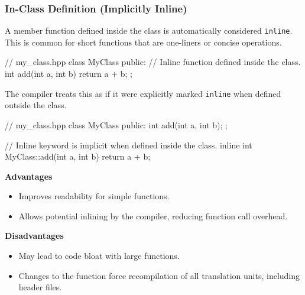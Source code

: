 \vspace{-0.5em}

\subsubsection{In-Class Definition (Implicitly Inline)}

\vspace{-0.5em}

A member function defined inside the class is automatically considered \texttt{inline}. This is common for short functions that are one-liners or concise operations.

\begin{codeblock}[language=C++, numbers=none]
// my_class.hpp
class MyClass {
public:
    // Inline function defined inside the class.
    int add(int a, int b) {
        return a + b;
    }
};
\end{codeblock}

The compiler treats this as if it were explicitly marked \texttt{inline} when defined outside the class.

\begin{codeblock}[language=C++, numbers=none]
// my_class.hpp
class MyClass {
public:
    int add(int a, int b);
};

// Inline keyword is implicit when defined inside the class.
inline int MyClass::add(int a, int b) {
    return a + b;
}
\end{codeblock}

\begin{minipage}[H]{0.48\textwidth}
    \textbf{Advantages}
    \begin{itemize}
        \item Improves readability for simple functions.
        \item Allows potential inlining by the compiler, reducing function call overhead.
    \end{itemize}
\end{minipage}%
\hfill
\begin{minipage}[H]{0.49\textwidth}
    \textbf{Disadvantages}
    \begin{itemize}
        \item May lead to code bloat with large functions.
        \item Changes to the function force recompilation of all translation units, including header files.
    \end{itemize}
\end{minipage}

